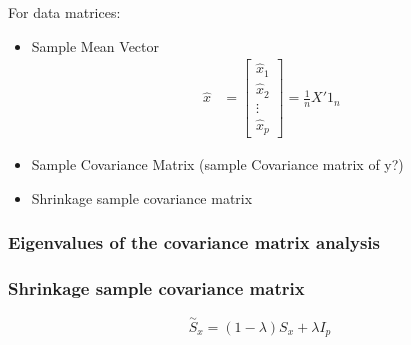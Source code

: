 For data matrices:
\begin{itemize}
    \item Sample Mean Vector
    \begin{align}
        \hat{x} &= \begin{bmatrix}
               \hat{x}_{1} \\
               \hat{x}_{2} \\
               \vdots \\
               \hat{x}_{p}
             \end{bmatrix} = \frac{1}{n}X'1_n
      \end{align}
      \item Sample Covariance Matrix (sample Covariance matrix of y?)
      \item Shrinkage sample covariance matrix
\end{itemize}

\subsubsection{Eigenvalues of the covariance matrix analysis}

\subsubsection{Shrinkage sample covariance matrix}
\begin{equation}
    \overset{\sim}{S}_x = (1-\lambda)S_x + \lambda I_p
\end{equation}



